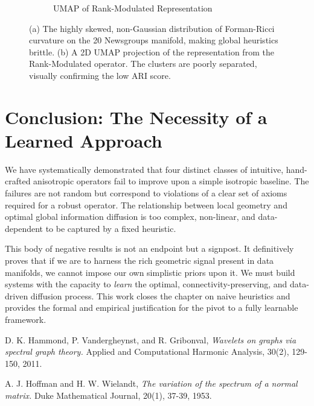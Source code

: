 \documentclass[11pt, letterpaper, twoside]{article}
\theoremstyle{definition}
\begin{document}
\begin{figure}[h!]
\begin{subfigure}[b]{0.48\textwidth}
        \caption{UMAP of Rank-Modulated Representation}
        \label{fig:failed_viz}
    \end{subfigure}
    \caption{(a) The highly skewed, non-Gaussian distribution of Forman-Ricci curvature on the 20 Newsgroups manifold, making global heuristics brittle. (b) A 2D UMAP projection of the representation from the Rank-Modulated operator. The clusters are poorly separated, visually confirming the low ARI score.}
    \label{fig:diagnostic_plots}
\end{figure}

\section{Conclusion: The Necessity of a Learned Approach}
We have systematically demonstrated that four distinct classes of intuitive, hand-crafted anisotropic operators fail to improve upon a simple isotropic baseline. The failures are not random but correspond to violations of a clear set of axioms required for a robust operator. The relationship between local geometry and optimal global information diffusion is too complex, non-linear, and data-dependent to be captured by a fixed heuristic.

This body of negative results is not an endpoint but a signpost. It definitively proves that if we are to harness the rich geometric signal present in data manifolds, we cannot impose our own simplistic priors upon it. We must build systems with the capacity to \textit{learn} the optimal, connectivity-preserving, and data-driven diffusion process. This work closes the chapter on naive heuristics and provides the formal and empirical justification for the pivot to a fully learnable framework.

\begin{thebibliography}{9}
    D. K. Hammond, P. Vandergheynst, and R. Gribonval,
    \textit{Wavelets on graphs via spectral graph theory.}
    Applied and Computational Harmonic Analysis, 30(2), 129-150, 2011.

    A. J. Hoffman and H. W. Wielandt,
    \textit{The variation of the spectrum of a normal matrix.}
    Duke Mathematical Journal, 20(1), 37-39, 1953.
\end{thebibliography}
\end{document}
